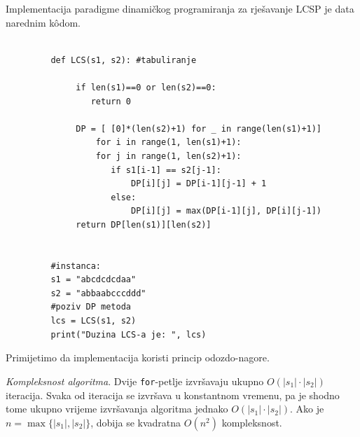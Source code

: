 	    
	 Implementacija paradigme dinamičkog programiranja za rješavanje LCSP je data narednim k\^odom. 
 \begin{verbatim}
	    	
	     def LCS(s1, s2): #tabuliranje
	    	      
	    	  if len(s1)==0 or len(s2)==0:
	    	     return 0
	    	     
	    	  DP = [ [0]*(len(s2)+1) for _ in range(len(s1)+1)]
	              for i in range(1, len(s1)+1):
	    	      for j in range(1, len(s2)+1):
	    		     if s1[i-1] == s2[j-1]: 
	    		         DP[i][j] = DP[i-1][j-1] + 1
	    		     else:
	    		         DP[i][j] = max(DP[i-1][j], DP[i][j-1])
	    	  return DP[len(s1)][len(s2)]        
	    		           
	    	      
	     #instanca:
	     s1 = "abcdcdcdaa"
	     s2 = "abbaabcccddd"
	     #poziv DP metoda
	     lcs = LCS(s1, s2)
	     print("Duzina LCS-a je: ", lcs)     
 \end{verbatim}
	     Primijetimo da implementacija koristi princip odozdo-nagore.
	     
	     \textit{Kompleksnost algoritma}. Dvije \texttt{for}-petlje  izvršavaju ukupno $O(|s_1|\cdot |s_2|)$ iteracija. Svaka od iteracija se izvršava u konstantnom vremenu, pa je shodno tome ukupno vrijeme izvršavanja algoritma jednako $O(|s_1| \cdot |s_2|)$. Ako je $n = \max\{|s_1|, |s_2|\}$, dobija se kvadratna $O(n^2)$ kompleksnost. 
	     
     
